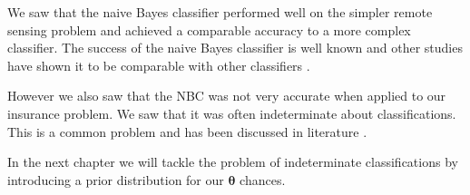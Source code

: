 We saw that the naive Bayes classifier performed well on the simpler remote sensing problem and achieved a comparable accuracy to a more complex classifier.
The success of the naive Bayes classifier is well known and other studies have shown it to be comparable with other classifiers \cite{Dumitru09}.

However we also saw that the NBC was not very accurate when applied to our insurance problem.
We saw that it was often indeterminate about classifications.
This is a common problem and has been discussed in literature \cite{Chen96}.

In the next chapter we will tackle the problem of indeterminate classifications by introducing a prior distribution for our $\bm{\theta}$ chances.